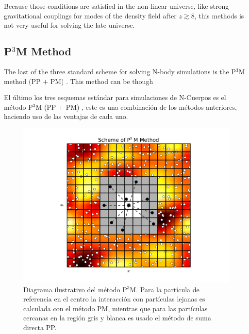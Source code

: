 Because those conditions are satisfied in the non-linear universe, like 
strong gravitational couplings for modes of the density field after 
$z\gtrsim 8$, this methods is not very useful for solving the late 
universe.



	\subsection{P$^3$M Method}
	\label{subsec:P3Method}
	
	

The last of the three standard scheme for solving N-body simulations is 
the P$^3$M method (PP $+$ PM) \cite{hockney1988}. This method can be 
though


El último los tres esquemas estándar para simulaciones de N-Cuerpos es el 
método P$^3$M (PP $+$ PM) \cite{hockney1988}, este es una combinación de 
los métodos anteriores, haciendo uso de las ventajas de cada uno.


\begin{figure}[htbp]
	\centering
	\includegraphics[width=1.00\textwidth]
	{./figures/3_nbody_simulations/P3M_Method.pdf}

	\caption{\small{Diagrama ilustrativo del método P$^3$M. Para la 
	partícula de referencia en el centro la interacción con partículas 
	lejanas es calculada con el método PM, mientras que para las 
	partículas cercanas en la región gris y blanca es usado el método de 
	suma directa PP.}}
	
	\label{fig:P3M_Method}
\end{figure}


